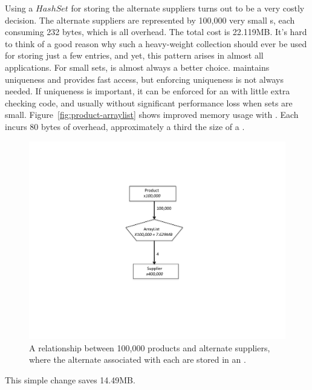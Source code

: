 Using a $HashSet$ for storing the alternate suppliers turns out to be a very
costly decision. The alternate suppliers are represented by 100,000
very small s, each consuming 232 bytes, which is all overhead.
The total cost is 22.119MB. 
It's hard to think of a good reason why such a heavy-weight collection should ever be used
 for storing just a few entries, and yet, this pattern arises in almost all
 applications. For small sets,  is almost always a better choice. 
  maintains uniqueness
  and provides fast access, but enforcing uniqueness
is not always needed. If uniqueness is
important, it can be enforced for an  
 with  little extra checking code, and usually without significant performance
 loss when sets are small. Figure~\ref{fig:product-arraylist} shows improved
 memory usage with . Each  incurs 80 bytes of overhead,
approximately a third the size of a .
 \begin{figure}
  \centering
 \includegraphics[width=.80\textwidth]{part1/Figures/collections/product-arraylist.pdf}
 \caption{A relationship between 100,000 products and alternate suppliers,
 where the alternate  associated with each  are
 stored in an .}
  \label{fig:graph-arraylist}
\end{figure}
This simple change saves 14.49MB. 


